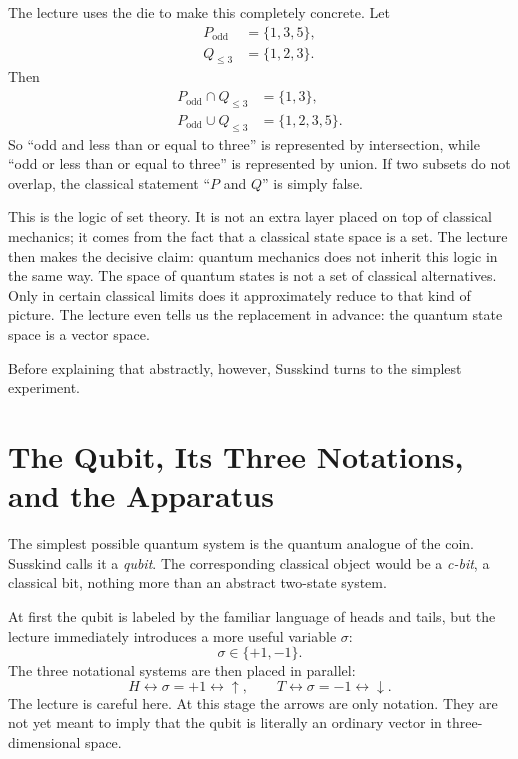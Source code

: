 The lecture uses the die to make this completely concrete. Let
\begin{align}
P_{\mathrm{odd}} &= \{1,3,5\},\\
Q_{\leq 3} &= \{1,2,3\}.
\end{align}
Then
\begin{align}
P_{\mathrm{odd}}\cap Q_{\leq 3} &= \{1,3\},\\
P_{\mathrm{odd}}\cup Q_{\leq 3} &= \{1,2,3,5\}.
\end{align}
So ``odd and less than or equal to three'' is represented by intersection, while ``odd or less than or equal to three'' is represented by union. If two subsets do not overlap, the classical statement ``\(P\) and \(Q\)'' is simply false.

This is the logic of set theory. It is not an extra layer placed on top of classical mechanics; it comes from the fact that a classical state space is a set. The lecture then makes the decisive claim: quantum mechanics does not inherit this logic in the same way. The space of quantum states is not a set of classical alternatives. Only in certain classical limits does it approximately reduce to that kind of picture. The lecture even tells us the replacement in advance: the quantum state space is a vector space.

Before explaining that abstractly, however, Susskind turns to the simplest experiment.

\section{The Qubit, Its Three Notations, and the Apparatus}

The simplest possible quantum system is the quantum analogue of the coin. Susskind calls it a \emph{qubit}. The corresponding classical object would be a \emph{c-bit}, a classical bit, nothing more than an abstract two-state system.

At first the qubit is labeled by the familiar language of heads and tails, but the lecture immediately introduces a more useful variable \(\sigma\):
\begin{equation}
\sigma\in\{+1,-1\}.
\end{equation}
The three notational systems are then placed in parallel:
\begin{equation}
H \leftrightarrow \sigma=+1 \leftrightarrow \uparrow,
\qquad
T \leftrightarrow \sigma=-1 \leftrightarrow \downarrow.
\end{equation}
The lecture is careful here. At this stage the arrows are only notation. They are not yet meant to imply that the qubit is literally an ordinary vector in three-dimensional space.

